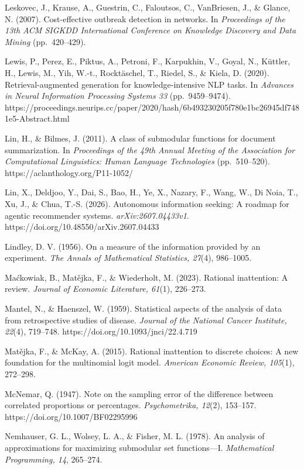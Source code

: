 \documentclass[
  11pt]{article}
\begin{document}
Leskovec, J., Krause, A., Guestrin, C., Faloutsos, C., VanBriesen, J.,
\& Glance, N. (2007). Cost-effective outbreak detection in networks. In
\emph{Proceedings of the 13th ACM SIGKDD International Conference on
Knowledge Discovery and Data Mining} (pp.~420--429).

Lewis, P., Perez, E., Piktus, A., Petroni, F., Karpukhin, V., Goyal, N.,
Küttler, H., Lewis, M., Yih, W.-t., Rocktäschel, T., Riedel, S., \&
Kiela, D. (2020). Retrieval-augmented generation for knowledge-intensive
NLP tasks. In \emph{Advances in Neural Information Processing Systems
33} (pp.~9459--9474).
https://proceedings.neurips.cc/paper/2020/hash/6b493230205f780e1bc26945df7481e5-Abstract.html

Lin, H., \& Bilmes, J. (2011). A class of submodular functions for
document summarization. In \emph{Proceedings of the 49th Annual Meeting
of the Association for Computational Linguistics: Human Language
Technologies} (pp.~510--520). https://aclanthology.org/P11-1052/

Lin, X., Deldjoo, Y., Dai, S., Bao, H., Ye, X., Nazary, F., Wang, W., Di
Noia, T., Xu, J., \& Chua, T.-S. (2026). Autonomous information seeking:
A roadmap for agentic recommender systems. \emph{arXiv:2607.04433v1}.
https://doi.org/10.48550/arXiv.2607.04433

Lindley, D. V. (1956). On a measure of the information provided by an
experiment. \emph{The Annals of Mathematical Statistics, 27}(4),
986--1005.

Maćkowiak, B., Matějka, F., \& Wiederholt, M. (2023). Rational
inattention: A review. \emph{Journal of Economic Literature, 61}(1),
226--273.

Mantel, N., \& Haenszel, W. (1959). Statistical aspects of the analysis
of data from retrospective studies of disease. \emph{Journal of the
National Cancer Institute, 22}(4), 719--748.
https://doi.org/10.1093/jnci/22.4.719

Matějka, F., \& McKay, A. (2015). Rational inattention to discrete
choices: A new foundation for the multinomial logit model.
\emph{American Economic Review, 105}(1), 272--298.

McNemar, Q. (1947). Note on the sampling error of the difference between
correlated proportions or percentages. \emph{Psychometrika, 12}(2),
153--157. https://doi.org/10.1007/BF02295996

Nemhauser, G. L., Wolsey, L. A., \& Fisher, M. L. (1978). An analysis of
approximations for maximizing submodular set functions---I.
\emph{Mathematical Programming, 14}, 265--274.
\end{document}
